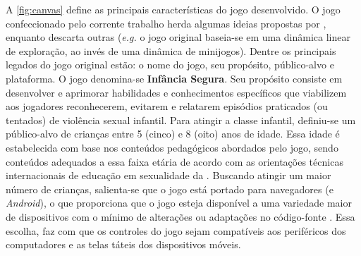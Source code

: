 
A \autoref{fig:canvas} define as principais características do jogo desenvolvido. O jogo confeccionado pelo corrente trabalho herda algumas ideias propostas por , enquanto descarta outras (\textit{e.g.} o jogo original baseia-se em uma dinâmica linear de exploração, ao invés de uma dinâmica de minijogos). Dentre os principais legados do jogo original estão: o nome do jogo, seu propósito, público-alvo e plataforma. O jogo denomina-se \textbf{Infância Segura}. Seu propósito consiste em desenvolver e aprimorar habilidades e conhecimentos específicos que viabilizem aos jogadores reconhecerem, evitarem e relatarem episódios praticados (ou tentados) de violência sexual infantil. Para atingir a classe infantil, definiu-se um público-alvo de crianças entre 5 (cinco) e 8 (oito) anos de idade. Essa idade é estabelecida com base nos conteúdos pedagógicos abordados pelo jogo, sendo conteúdos adequados a essa faixa etária de acordo com as orientações técnicas internacionais de educação em sexualidade da . Buscando atingir um maior número de crianças, salienta-se que o jogo está portado para navegadores (e \textit{Android}), o que proporciona que o jogo esteja disponível a uma variedade maior de dispositivos com o mínimo de alterações ou adaptações no código-fonte \cite{carrara2018criancca}. Essa escolha, faz com que os controles do jogo sejam compatíveis aos periféricos dos computadores e as telas táteis dos dispositivos móveis.


